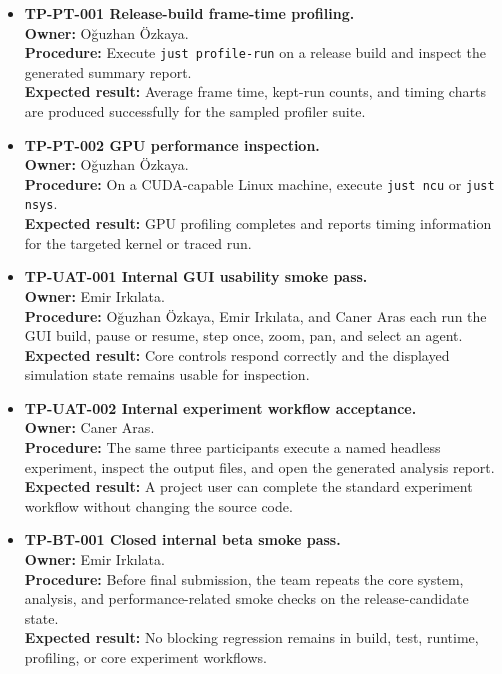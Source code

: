 \begin{itemize}[leftmargin=*]
	\item \textbf{TP-PT-001 Release-build frame-time profiling.}\\
	      \textbf{Owner:} Oğuzhan Özkaya.\\
	      \textbf{Procedure:} Execute \texttt{just profile-run} on a release build and inspect
	      the generated summary report.\\
	      \textbf{Expected result:} Average frame time, kept-run counts, and timing charts are
	      produced successfully for the sampled profiler suite.

	\item \textbf{TP-PT-002 GPU performance inspection.}\\
	      \textbf{Owner:} Oğuzhan Özkaya.\\
	      \textbf{Procedure:} On a CUDA-capable Linux machine, execute \texttt{just ncu} or
	      \texttt{just nsys}.\\
	      \textbf{Expected result:} GPU profiling completes and reports timing information for
	      the targeted kernel or traced run.

	\item \textbf{TP-UAT-001 Internal GUI usability smoke pass.}\\
	      \textbf{Owner:} Emir Irkılata.\\
	      \textbf{Procedure:} Oğuzhan Özkaya, Emir Irkılata, and Caner Aras each run the GUI
	      build, pause or resume, step once, zoom, pan, and select an agent.\\
	      \textbf{Expected result:} Core controls respond correctly and the displayed simulation
	      state remains usable for inspection.

	\item \textbf{TP-UAT-002 Internal experiment workflow acceptance.}\\
	      \textbf{Owner:} Caner Aras.\\
	      \textbf{Procedure:} The same three participants execute a named headless experiment,
	      inspect the output files, and open the generated analysis report.\\
	      \textbf{Expected result:} A project user can complete the standard experiment workflow
	      without changing the source code.

	\item \textbf{TP-BT-001 Closed internal beta smoke pass.}\\
	      \textbf{Owner:} Emir Irkılata.\\
	      \textbf{Procedure:} Before final submission, the team repeats the core system,
	      analysis, and performance-related smoke checks on the release-candidate state.\\
	      \textbf{Expected result:} No blocking regression remains in build, test, runtime,
	      profiling, or core experiment workflows.
\end{itemize}
